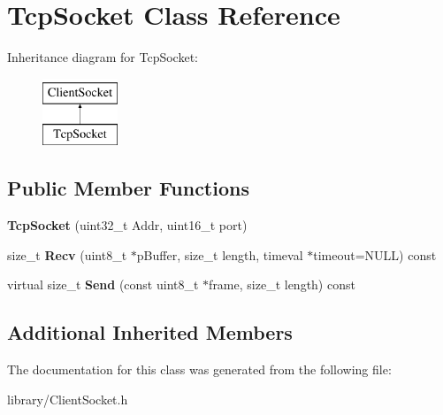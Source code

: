 \hypertarget{class_tcp_socket}{\section{Tcp\-Socket Class Reference}
\label{class_tcp_socket}
}
Inheritance diagram for Tcp\-Socket\-:\begin{figure}[H]
\begin{center}
\leavevmode
\includegraphics[height=2.000000cm]{class_tcp_socket}
\end{center}
\end{figure}
\subsection*{Public Member Functions}
\begin{DoxyCompactItemize}
\item 
\hypertarget{class_tcp_socket_ac7d0bc1afd5de6ed718785d35c656bb3}{{\bfseries Tcp\-Socket} (uint32\-\_\-t Addr, uint16\-\_\-t port)}\label{class_tcp_socket_ac7d0bc1afd5de6ed718785d35c656bb3}

\item 
\hypertarget{class_tcp_socket_ae11e390e4c9f9de484da2868a25d1623}{size\-\_\-t {\bfseries Recv} (uint8\-\_\-t $\ast$p\-Buffer, size\-\_\-t length, timeval $\ast$timeout=N\-U\-L\-L) const }\label{class_tcp_socket_ae11e390e4c9f9de484da2868a25d1623}

\item 
\hypertarget{class_tcp_socket_add01c46a43a1663da73ec620dd9ad5ef}{virtual size\-\_\-t {\bfseries Send} (const uint8\-\_\-t $\ast$frame, size\-\_\-t length) const }\label{class_tcp_socket_add01c46a43a1663da73ec620dd9ad5ef}

\end{DoxyCompactItemize}
\subsection*{Additional Inherited Members}


The documentation for this class was generated from the following file\-:\begin{DoxyCompactItemize}
\item 
library/Client\-Socket.\-h\end{DoxyCompactItemize}
